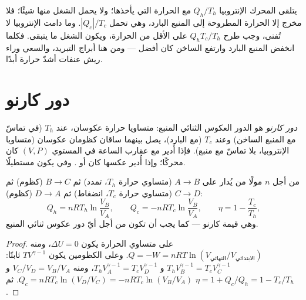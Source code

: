 \begin{remark}\label{rem:b1:heat-engines:why}
يتلقى المحرك الإنتروبيا $Q_h/T_h$ مع الحرارة التي يأخذها؛ ولا يحمل
الشغل منها شيئًا؛ فلا مخرج إلا الحرارة المطروحة إلى المنبع البارد،
وهي تحمل $|Q_c|/T_c$. وما دامت الإنتروبيا لا تُفنى، وجب طرح
$Q_h T_c/T_h$ على الأقل من الحرارة، ويكون الشغل ما يتبقى.
فكلما انخفض المنبع البارد وارتفع الساخن كان أفضل --- ومن هنا
أبراج التبريد، والسعي وراء ريش عنفات أشدّ حرارة أبدًا.
\end{remark}

\section{دور كارنو}

\begin{definition}\label{def:b1:heat-engines:carnotcycle}
\emph{دور كارنو} هو الدور العكوس الثنائي المنبع: متساويا حرارة
عكوسان، عند $T_h$ (في تماسّ مع المنبع الساخن) وعند $T_c$ (مع
البارد)، يصل بينهما ساقان كظومان عكوسان (متساويا الإنتروبيا،
بلا تماسّ مع منبع). فإذا أُدير مع عقارب الساعة في المستوي $(V, P)$ كان
محركًا؛ وإذا أُدير عكسها كان  أو . وفي  يكون مستطيلًا.
\end{definition}

\begin{proposition}\label{prop:b1:heat-engines:carnotgas}
من أجل $n$ مولًا من  يُدار على $A \to B$ (متساوي حرارة $T_h$،
تمدد) ثم $B \to C$ (كظوم) ثم $C \to D$ (متساوي حرارة $T_c$،
انضغاط) ثم $D \to A$ (كظوم):
\[
Q_h = nRT_h\ln\frac{V_B}{V_A}, \qquad
Q_c = -nRT_c\ln\frac{V_B}{V_A}, \qquad
\eta = 1 - \frac{T_c}{T_h} ,
\]
وهي قيمة كارنو --- كما يجب أن تكون من أجل أيّ دور عكوس ثنائي المنبع.
\end{proposition}

\begin{proof}
على متساوي الحرارة يكون $\Delta U = 0$، ومنه $Q = -W = nRT\ln(V_{\text{النهائي}}/
V_{\text{الابتدائي}})$. وعلى الكظومين يكون $TV^{\gamma-1}$ ثابتًا:
$T_hV_B^{\gamma-1} = T_cV_C^{\gamma-1}$ و $T_hV_A^{\gamma-1} =
T_cV_D^{\gamma-1}$، ومنه $V_C/V_D = V_B/V_A$ و $Q_c = nRT_c\ln(V_D/V_C) =
-nRT_c\ln(V_B/V_A)$. ثم $\eta = 1 + Q_c/Q_h = 1 - T_c/T_h$.
\end{proof}

